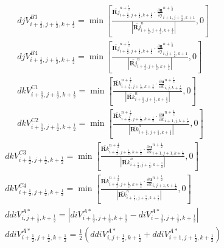 \begin{enumerate}
\begin{eqnarray*}
		&&djV^{B3}_{i+\frac{1}{2},j+\frac{1}{2},k+\frac{1}{2}}=\min{\left[\frac{\bar{\bm Rj}^{n+\frac{1}{2}}_{i+\frac{1}{2},j+\frac{1}{2},k+\frac{1}{2}}\cdot{\frac{\partial \bm u}{\partial j}}^{n+\frac{1}{2}}_{i+1,j+\frac{1}{2},k+1}}{\left|\bar{\bm Rj}^n_{i+\frac{1}{2},j+\frac{1}{2},k+\frac{1}{2}}\right|},0\right]}\\
		&&djV^{B4}_{i+\frac{1}{2},j+\frac{1}{2},k+\frac{1}{2}}=\min{\left[\frac{\bar{\bm Rj}^{n+\frac{1}{2}}_{i+\frac{1}{2},j+\frac{1}{2},k+\frac{1}{2}}\cdot{\frac{\partial \bm u}{\partial j}}^{n+\frac{1}{2}}_{i,j+\frac{1}{2},k+1}}{\left|\bar{\bm Rj}^n_{i+\frac{1}{2},j+\frac{1}{2},k+\frac{1}{2}}\right|},0\right]}\\
		&&dkV^{C1}_{i+\frac{1}{2},j+\frac{1}{2},k+\frac{1}{2}}=\min{\left[\frac{\bar{\bm Rk}^{n+\frac{1}{2}}_{i+\frac{1}{2},j+\frac{1}{2},k+\frac{1}{2}}\cdot{\frac{\partial \bm u}{\partial k}}^{n+\frac{1}{2}}_{i,j,k+\frac{1}{2}}}{\left|\bar{\bm Rk}^n_{i+\frac{1}{2},j+\frac{1}{2},k+\frac{1}{2}}\right|},0\right]}\\
		&&dkV^{C2}_{i+\frac{1}{2},j+\frac{1}{2},k+\frac{1}{2}}=\min{\left[\frac{\bar{\bm Rk}^{n+\frac{1}{2}}_{i+\frac{1}{2},j+\frac{1}{2},k+\frac{1}{2}}\cdot{\frac{\partial \bm u}{\partial k}}^{n+\frac{1}{2}}_{i+1,j,k+\frac{1}{2}}}{\left|\bar{\bm Rk}^n_{i+\frac{1}{2},j+\frac{1}{2},k+\frac{1}{2}}\right|},0\right]}
	\end{eqnarray*}
	\begin{eqnarray*}	
		&&dkV^{C3}_{i+\frac{1}{2},j+\frac{1}{2},k+\frac{1}{2}}=\min{\left[\frac{\bar{\bm Rk}^{n+\frac{1}{2}}_{i+\frac{1}{2},j+\frac{1}{2},k+\frac{1}{2}}\cdot{\frac{\partial \bm u}{\partial k}}^{n+\frac{1}{2}}_{i+1,j+1,k+\frac{1}{2}}}{\left|\bar{\bm Rk}^n_{i+\frac{1}{2},j+\frac{1}{2},k+\frac{1}{2}}\right|},0\right]}\\
		&&dkV^{C4}_{i+\frac{1}{2},j+\frac{1}{2},k+\frac{1}{2}}=\min{\left[\frac{\bar{\bm Rk}^{n+\frac{1}{2}}_{i+\frac{1}{2},j+\frac{1}{2},k+\frac{1}{2}}\cdot{\frac{\partial \bm u}{\partial k}}^{n+\frac{1}{2}}_{i,j+1,k+\frac{1}{2}}}{\left|\bar{\bm Rk}^n_{i+\frac{1}{2},j+\frac{1}{2},k+\frac{1}{2}}\right|},0\right]}\\
		&&ddiV^{A*}_{i,j+\frac{1}{2},k+\frac{1}{2}}=\left|diV^{A*}_{i+\frac{1}{2},j+\frac{1}{2},k+\frac{1}{2}}-diV^{A*}_{i-\frac{1}{2},j+\frac{1}{2},k+\frac{1}{2}}\right|\\
		&&ddiV^{A*}_{i+\frac{1}{2},j+\frac{1}{2},k+\frac{1}{2}}=\frac{1}{2}\left(ddiV^{A*}_{i,j+\frac{1}{2},k+\frac{1}{2}}+ddiV^{A*}_{i+1,j+\frac{1}{2},k+\frac{1}{2}}\right)\\

\end{eqnarray*}
\end{enumerate}
